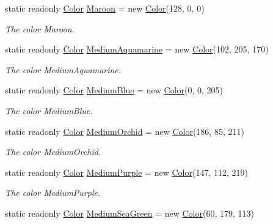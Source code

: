 \begin{DoxyCompactItemize}
static readonly \hyperlink{struct_tri_devs_1_1_tri_engine2_d_1_1_color}{Color} \hyperlink{struct_tri_devs_1_1_tri_engine2_d_1_1_color_a8b265688747842df7f69f02760b83cfc}{Maroon} = new \hyperlink{struct_tri_devs_1_1_tri_engine2_d_1_1_color}{Color}(128, 0, 0)
\begin{DoxyCompactList}\small\item\em The color Maroon. \end{DoxyCompactList}\item 
static readonly \hyperlink{struct_tri_devs_1_1_tri_engine2_d_1_1_color}{Color} \hyperlink{struct_tri_devs_1_1_tri_engine2_d_1_1_color_aa8bcde16a09e3e797fc0fc98b2bc1b94}{Medium\-Aquamarine} = new \hyperlink{struct_tri_devs_1_1_tri_engine2_d_1_1_color}{Color}(102, 205, 170)
\begin{DoxyCompactList}\small\item\em The color Medium\-Aquamarine. \end{DoxyCompactList}\item 
static readonly \hyperlink{struct_tri_devs_1_1_tri_engine2_d_1_1_color}{Color} \hyperlink{struct_tri_devs_1_1_tri_engine2_d_1_1_color_a9b6d2c2a2a25e0a116abd8433df80c1f}{Medium\-Blue} = new \hyperlink{struct_tri_devs_1_1_tri_engine2_d_1_1_color}{Color}(0, 0, 205)
\begin{DoxyCompactList}\small\item\em The color Medium\-Blue. \end{DoxyCompactList}\item 
static readonly \hyperlink{struct_tri_devs_1_1_tri_engine2_d_1_1_color}{Color} \hyperlink{struct_tri_devs_1_1_tri_engine2_d_1_1_color_aaed02ff71016d54a7b8b6a692d0d0112}{Medium\-Orchid} = new \hyperlink{struct_tri_devs_1_1_tri_engine2_d_1_1_color}{Color}(186, 85, 211)
\begin{DoxyCompactList}\small\item\em The color Medium\-Orchid. \end{DoxyCompactList}\item 
static readonly \hyperlink{struct_tri_devs_1_1_tri_engine2_d_1_1_color}{Color} \hyperlink{struct_tri_devs_1_1_tri_engine2_d_1_1_color_af40d778587de61985601bf91672d1504}{Medium\-Purple} = new \hyperlink{struct_tri_devs_1_1_tri_engine2_d_1_1_color}{Color}(147, 112, 219)
\begin{DoxyCompactList}\small\item\em The color Medium\-Purple. \end{DoxyCompactList}\item 
static readonly \hyperlink{struct_tri_devs_1_1_tri_engine2_d_1_1_color}{Color} \hyperlink{struct_tri_devs_1_1_tri_engine2_d_1_1_color_a57de4b1e52fdd316f15226473beb6293}{Medium\-Sea\-Green} = new \hyperlink{struct_tri_devs_1_1_tri_engine2_d_1_1_color}{Color}(60, 179, 113)

\end{DoxyCompactItemize}
